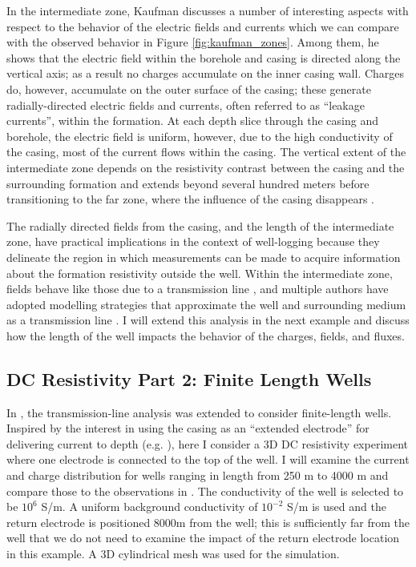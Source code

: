 In the intermediate zone, Kaufman discusses a number of interesting aspects with respect to  the behavior of the electric fields and currents which we can compare with the observed behavior in Figure \ref{fig:kaufman_zones}. Among them, he shows that the electric field within the borehole and casing is directed along the vertical axis; as a result no charges accumulate on the inner casing wall. Charges do, however, accumulate on the outer surface of the casing; these  generate radially-directed electric fields and currents, often referred to as “leakage currents”, within the formation. At each depth slice through the casing and borehole, the electric field is uniform, however, due to the high conductivity of the casing, most of the current flows within the casing.  The vertical extent of the intermediate zone depends on the resistivity contrast between the casing and the surrounding formation and extends beyond several hundred meters before transitioning to the far zone, where the influence of the casing disappears \citep{Kaufman1990}.

The radially directed fields from the casing, and the length of the intermediate zone, have practical implications in the context of well-logging because they delineate the region in which measurements can be made to acquire information about the formation resistivity outside the well. Within the intermediate zone, fields behave like those due to a transmission line \citep{Kaufman1990}, and multiple authors have adopted modelling strategies that approximate the well and surrounding medium as a transmission line \citep{Kong2009, Aldridge2015}. I will extend this analysis in the next example and discuss how the length of the well impacts the behavior of the charges, fields, and fluxes.
\subsection{DC Resistivity Part 2: Finite Length Wells}
\label{sec:dc_resistivity_part2}

In \citep{Kaufman1993}, the transmission-line analysis was extended to consider finite-length wells. Inspired by the interest in using the casing as an ``extended electrode'' for delivering current to depth (e.g. \cite{Schenkel1994, Um2015, Weiss2016, hoversten2017borehole}), here I consider a 3D DC resistivity experiment where one electrode is connected to the top of the well. I will examine the current and charge distribution for wells ranging in length from 250 m to 4000 m and compare those to the observations in \citep{Kaufman1993}. The conductivity of the well is selected to be $10^6$ S/m. A uniform background conductivity of $10^{-2}$ S/m is used and the return electrode is positioned 8000m from the well; this is sufficiently far from the well that we do not need to examine the impact of the return electrode location in this example. A 3D cylindrical mesh was used for the simulation.

